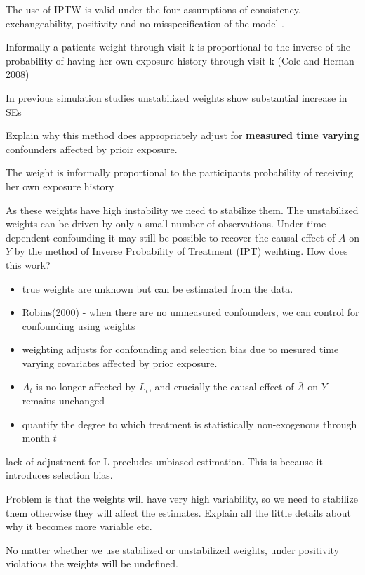 \documentclass[11pt]{article}
\providecommand{\tightlist}{%
      \setlength{\itemsep}{0pt}\setlength{\parskip}{0pt}}
\begin{document}
The use of IPTW is valid under the four assumptions of consistency,
exchangeability, positivity and no misspecification of the model
\citet{Cole2008}.

Informally a patients weight through visit k is proportional to the
inverse of the probability of having her own exposure history through
visit k (Cole and Hernan 2008)

In previous simulation studies unstabilized weights show substantial
increase in SEs

Explain why this method does appropriately adjust for \textbf{measured
time varying} confounders affected by prioir exposure.

The weight is informally proportional to the participants probability of
receiving her own exposure history

As these weights have high instability we need to stabilize them. The
unstabilized weights can be driven by only a small number of
observations. Under time dependent confounding it may still be possible
to recover the causal effect of \(A\) on \(Y\) by the method of Inverse
Probability of Treatment (IPT) weihting. How does this work?

\begin{itemize}
\tightlist
\item
  true weights are unknown but can be estimated from the data.
\item
  Robins(2000) - when there are no unmeasured confounders, we can
  control for confounding using weights
\item
  weighting adjusts for confounding and selection bias due to mesured
  time varying covariates affected by prior exposure.
\item
  \(A_t\) is no longer affected by \(L_t\), and crucially the causal
  effect of \(\bar A\) on \(Y\) remains unchanged
\item
  quantify the degree to which treatment is statistically non-exogenous
  through month \(t\)
\end{itemize}

lack of adjustment for L precludes unbiased estimation. This is because
it introduces selection bias.

Problem is that the weights will have very high variability, so we need
to stabilize them otherwise they will affect the estimates. Explain all
the little details about why it becomes more variable etc.

No matter whether we use stabilized or unstabilized weights, under
positivity violations the weights will be undefined.
\end{document}
